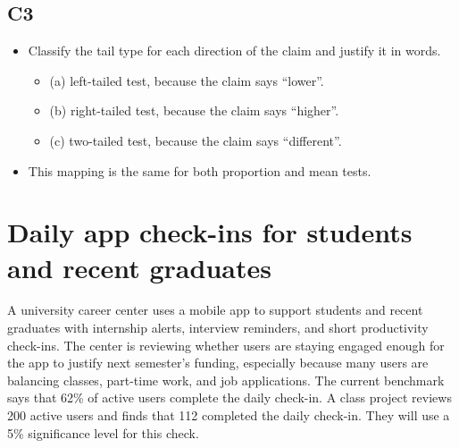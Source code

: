 	\subsection*{C3}
	\begin{itemize}
		\item Classify the tail type for each direction of the claim and justify it in words.
		\begin{itemize}
			\item (a) left-tailed test, because the claim says ``lower''.\LeftTailGraph
			\item (b) right-tailed test, because the claim says ``higher''.\RightTailGraph
			\item (c) two-tailed test, because the claim says ``different''.\TwoTailGraph
		\end{itemize}
		\item This mapping is the same for both proportion and mean tests.
	\end{itemize}


	\section{Daily app check-ins for students and recent graduates}
		A university career center uses a mobile app to support students and recent graduates with internship alerts, interview reminders, and short productivity check-ins. The center is reviewing whether users are staying engaged enough for the app to justify next semester's funding, especially because many users are balancing classes, part-time work, and job applications. The current benchmark says that 62\% of active users complete the daily check-in. A class project reviews 200 active users and finds that 112 completed the daily check-in. They will use a 5\% significance level for this check.
		
